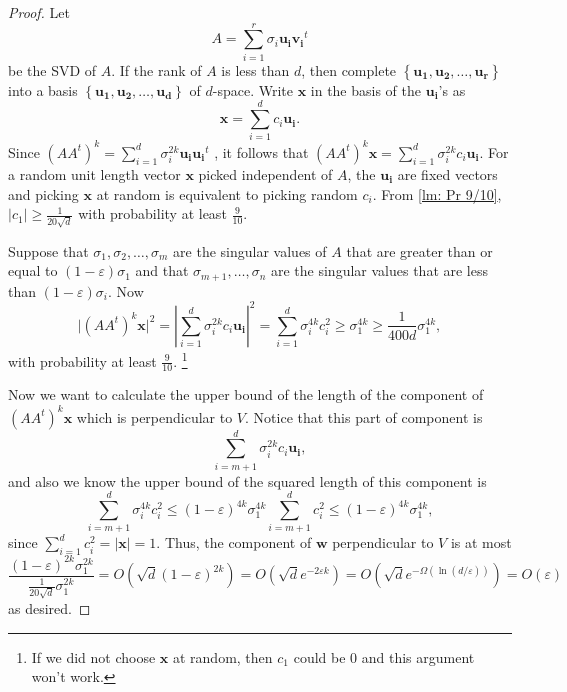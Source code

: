 \begin{proof}
  Let 
  \[
    A = \sum_{i=1}^r \sigma _i \mathbf{u_i} \mathbf{v_i}^t  
  \] be the SVD of \(A\). If the rank of \(A\) is less than \(d\), then complete \(\left\{ \mathbf{u_1}, \mathbf{u_2}, \dots , \mathbf{u_r} \right\} \) into a basis \(\left\{ \mathbf{u_1}, \mathbf{u_2}, \dots , \mathbf{u_d}    \right\} \) of \(d\)-space. Write \(\mathbf{x} \) in the basis of the \(\mathbf{u_i} \)'s as 
  \[
    \mathbf{x} = \sum_{i=1}^{d} c_i \mathbf{u_i}.  
  \]   
  Since \(\left( A A^t \right)^k = \sum_{i=1}^d \sigma _i^{2k} \mathbf{u_i} \mathbf{u_i}^t \) , it follows that \(\left( A A^t \right)^k \mathbf{x}  = \sum_{i=1}^d \sigma _i^{2k} c_i \mathbf{u_i}    \). For a random unit length vector \(\mathbf{x} \) picked independent of \(A\), the \(\mathbf{u_i} \) are fixed vectors and picking \(\mathbf{x} \) at random is equivalent to picking random \(c_i\). From \autoref{lm: Pr 9/10}, \(\vert c_1 \vert \ge \frac{1}{20\sqrt{d} } \) with probability at least \(\frac{9}{10}\).
  
  Suppose that \(\sigma _1, \sigma _2, \dots , \sigma _m\) are the singular values of \(A\) that are greater than or equal to \((1 - \varepsilon )\sigma _1\) and that \(\sigma _{m+1}, \dots , \sigma _n\) are the singular values that are less than \((1 - \varepsilon )\sigma _i\). 
  Now
  \[
    \vert \left( A A^t \right)^k \mathbf{x}  \vert^2 = \left\vert \sum_{i=1}^{d} \sigma _i^{2k} c_i \mathbf{u_i}    \right\vert^2 = \sum_{i=1}^d \sigma_i^{4k} c_i^2 \ge \sigma _1^{4k} \ge \frac{1}{400d}\sigma _1^{4k},   
  \]
  with probability at least \(\frac{9}{10}\). \footnote{If we did not choose \(\mathbf{x} \) at random, then \(c_1\) could be \(0\) and this argument won't work.   }

  Now we want to calculate the upper bound of the length of the component of \(\left( A A^t \right)^k \mathbf{x}  \) which is perpendicular to \(V\). Notice that this part of component is 
  \[
    \sum_{i=m+1}^{d} \sigma _i^{2k} c_i \mathbf{u_i},   
  \]   
  and also we know the upper bound of the squared length of this component is
  \[
    \sum_{i=m+1}^d \sigma _i^{4k} c_i^2 \le (1 - \varepsilon )^{4k} \sigma _1^{4k} \sum_{i=m+1}^{d} c_i^2 \le (1 - \varepsilon )^{4k} \sigma _1^{4k},       
  \]  since \(\sum_{i=1}^{d} c_i^2 = \vert \mathbf{x}  \vert = 1  \).  Thus, the component of \(\mathbf{w} \) perpendicular to \(V\) is at most 
  \[
    \frac{(1 - \varepsilon )^{2k} \sigma _1^{2k}  }{\frac{1}{20 \sqrt{d} } \sigma _1^{2k} } = O \left( \sqrt{d} (1 - \varepsilon )^{2k}  \right) = O \left( \sqrt{d} e^{-2 \varepsilon k} \right) = O \left( \sqrt{d} e^{- \Omega \left( \ln \left(  d / \varepsilon \right)  \right) }  \right)   = O(\varepsilon )
  \]
  as desired.


\end{proof}
